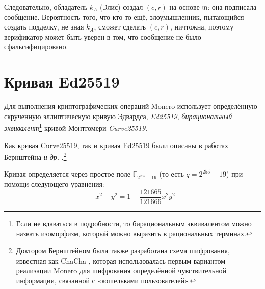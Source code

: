 Следовательно, обладатель $k_A$ (Элис) создал $(c,r)$ на основе $\mathfrak{m}$: она подписала сообщение. Вероятность того, что кто-то ещё, злоумышленник, пытающийся создать подделку, не зная $k_A$, сможет сделать $(c,r)$, ничтожна, поэтому верификатор может быть уверен в том, что сообщение не было сфальсифицировано.



\section{Кривая Ed25519}
\label{Ed25519_section}

Для выполнения криптографических операций Monero использует определённую скрученную эллиптическую кривую Эдвардса, {\em Ed25519}, {\em бирациональный эквивалент}\footnote{\label{birational_note}Если не вдаваться в подробности, то бирациональным эквивалентом можно назвать изоморфизм, который можно выразить в рациональных терминах.} 
кривой Монтгоме\-ри {\em Curve25519}.

Как кривая Curve25519, так и кривая Ed25519 были описаны в работах Бернштейна {\em и др.} \cite{Bernstein2008, Bernstein2012, Bernstein2007}.\footnote{Доктором Бернштейном была также разработана схема шифрования, известная как ChaCha \cite{Bernstein_chacha,chacha-irtf}, которая использовалась первым вариантом реализации Monero для шифрования определённой чувствительной информации, связанной с «кошельками пользователей».}

Кривая определяется через простое поле \(\mathbb{F}_{2^{255} - 19}\) (то есть $q = 2^{255}-19$) при помощи следующе\-го уравнения:\vspace{.175cm}
\[-x^2 + y^2 = 1 - \frac{121665}{121666} x^2 y^2\]

